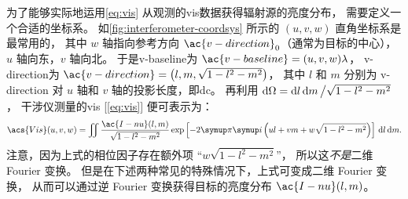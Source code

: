 为了能够实际地运用\autoref{eq:vis} 从观测的\ac{vis}数据获得辐射源的亮度分布，
需要定义一个合适的坐标系。
如\autoref{fig:interferometer-coordsys} 所示的 $(u,v,w)$ 直角坐标系是最常用的，
其中 $w$ 轴指向参考方向 $\ac{v-direction}_0$（通常为目标的中心），
$u$ 轴向东，$v$ 轴向北。
于是\acl{v-baseline}为 $\ac{v-baseline} = (u,v,w) \lambda$，
\acl{v-direction}为 $\ac{v-direction} = \left( l, m, \sqrt{1-l^2-m^2} \right)$，
其中 $l$ 和 $m$ 分别为 \ac{v-direction} 对 $u$ 轴和 $v$ 轴的投影长度，即\ac{dc}。
再利用 $\mathrm{d}\Omega = \mathrm{d}l\,\mathrm{d}m \,\big/ \sqrt{1-l^2-m^2}$，
干涉仪测量的\ac{vis} [\autoref{eq:vis}] 便可表示为：
\begin{equation}
  \label{eq:vis-uvw}
  \acs{Vis}(u,v,w) = \iint \frac{\ac{I-nu}(l,m)}{\sqrt{1-l^2-m^2}}
    \exp \left[ -2\Cpi\Ci \left( ul+vm+w\sqrt{1-l^2-m^2} \right) \right]
    \,\D{l}\,\D{m} .
\end{equation}
注意，因为上式的相位因子存在额外项 \enquote{$w \sqrt{1-l^2-m^2}$}，
所以这\emph{不是}二维 Fourier 变换。
但是在下述两种常见的特殊情况下，上式可变成二维 Fourier 变换，
从而可以通过逆 Fourier 变换获得目标的亮度分布 $\ac{I-nu}(l,m)$。
